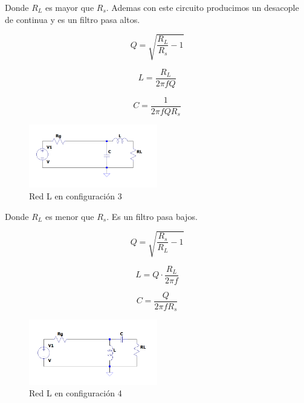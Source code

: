 Donde $R_L$ es mayor que $R_s$. Ademas con este circuito producimos un desacople de continua y es un filtro pasa altos.



\begin{equation}
    Q = \sqrt{\frac{R_L}{R_s}-1}
\end{equation}

\begin{equation}
    L = \frac{R_L}{2 \pi f Q}
\end{equation}

\begin{equation}
    C = \frac{1}{2 \pi f Q R_s}
\end{equation}



\begin{figure}[H]
    \centering
    \includegraphics[width=0.5\textwidth]{imagenes/redesL3.png}
    \caption{Red L en configuración 3}
    \label{fig:redL3}
\end{figure}

Donde $R_L$ es menor que $R_s$. Es un filtro pasa bajos.


\begin{equation}
    Q = \sqrt{\frac{R_s}{R_L}-1}
\end{equation}

\begin{equation}
    L = Q \cdot \frac{R_L}{2 \pi f}
\end{equation}

\begin{equation}
    C = \frac{Q}{2 \pi f R_s}
\end{equation}



\begin{figure}[H]
    \centering
    \includegraphics[width=0.5\textwidth]{imagenes/redesL4.png}
    \caption{Red L en configuración 4}
    \label{fig:redL4}
\end{figure}

